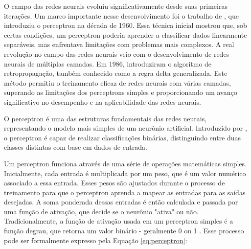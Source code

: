 O campo das redes neurais evoluiu significativamente desde suas primeiras iterações. Um marco importante nesse desenvolvimento foi o trabalho de , que introduziu o perceptron na década de 1960. Essa técnica inicial mostrou que, sob certas condições, um perceptron poderia aprender a classificar dados linearmente separáveis, mas enfrentava limitações com problemas mais complexos.
A real revolução no campo das redes neurais veio com o desenvolvimento de redes neurais de múltiplas camadas. Em 1986,  introduziram o algoritmo de retropropagação, também conhecido como a regra delta generalizada. Este método permitiu o treinamento eficaz de redes neurais com várias camadas, superando as limitações dos perceptrons simples e proporcionando um avanço significativo no desempenho e na aplicabilidade das redes neurais.


O perceptron é uma das estruturas fundamentais das redes neurais, representando o modelo mais simples de um neurônio artificial. Introduzido por , o perceptron é capaz de realizar classificações binárias, distinguindo entre duas classes distintas com base em dados de entrada.

Um perceptron funciona através de uma série de operações matemáticas simples. Inicialmente, cada entrada é multiplicada por um peso, que é um valor numérico associado a essa entrada. Esses pesos são ajustados durante o processo de treinamento para que o perceptron aprenda a mapear as entradas para as saídas desejadas. A soma ponderada dessas entradas é então calculada e passada por uma função de ativação, que decide se o neurônio "ativa" ou não. Tradicionalmente, a função de ativação usada em um perceptron simples é a função degrau, que retorna um valor binário - geralmente 0 ou 1 \cite{hertz2018introduction}. Esse processo pode ser formalmente expresso pela Equação \ref{eq:perceptron}:

